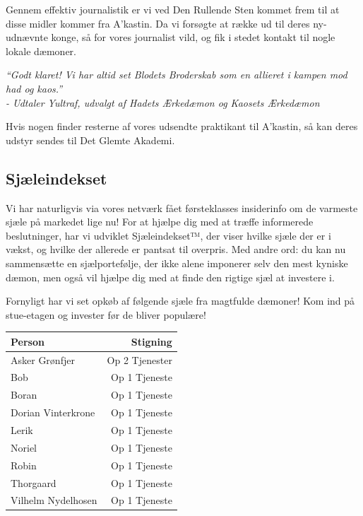 \documentclass[letterpaper,12pt]{memoir}
\newenvironment{pullquote}
  {\begin{tcolorbox}\itshape\large}
  {\end{tcolorbox}}
\begin{document}
Gennem effektiv journalistik er vi ved Den Rullende Sten kommet frem til at disse midler kommer fra A'kastin. Da vi forsøgte at række ud til deres ny-udnævnte konge, så for vores journalist vild, og fik i stedet kontakt til nogle lokale dæmoner.

\begin{pullquote}
“Godt klaret! Vi har altid set Blodets Broderskab som en allieret i kampen mod had og kaos.”\\
\textit{- Udtaler Yultraf, udvalgt af Hadets Ærkedæmon og Kaosets Ærkedæmon}
\end{pullquote}

Hvis nogen finder resterne af vores udsendte praktikant til A'kastin, så kan deres udstyr sendes til Det Glemte Akademi.

\subsection*{Sjæleindekset}
Vi har naturligvis via vores netværk fået førsteklasses insiderinfo om de varmeste sjæle på markedet lige nu! For at hjælpe dig med at træffe informerede beslutninger, har vi udviklet Sjæleindekset™, der viser hvilke sjæle der er i vækst, og hvilke der allerede er pantsat til overpris. Med andre ord: du kan nu sammensætte en sjælportefølje, der ikke alene imponerer selv den mest kyniske dæmon, men også vil hjælpe dig med at finde den rigtige sjæl at investere i.

Fornyligt har vi set opkøb af følgende sjæle fra magtfulde dæmoner! Kom ind på stue-etagen og invester før de bliver populære!\\
\begin{table}[htbp]
\begin{tabular}{l|r}
Person & Stigning \\ \hline
Asker Grønfjer & Op 2 Tjenester\\
Bob &  Op 1 Tjeneste \\
Boran & Op 1 Tjeneste  \\
Dorian Vinterkrone &  Op 1 Tjeneste \\
Lerik &  Op 1 Tjeneste \\
Noriel &  Op 1 Tjeneste \\
Robin &  Op 1 Tjeneste \\
Thorgaard &  Op 1 Tjeneste \\
Vilhelm Nydelhosen &  Op 1 Tjeneste 
\end{tabular}
\end{table}
\end{document}
